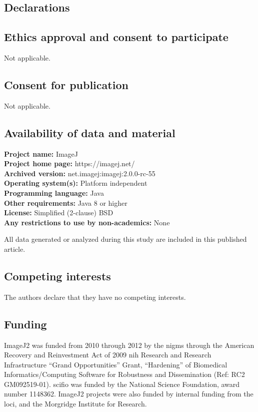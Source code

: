 \documentclass{bmcart}
\begin{document}
\begin{backmatter}

\section*{Declarations}

\subsection*{Ethics approval and consent to participate}
Not applicable.

\subsection*{Consent for publication}
Not applicable.

\subsection*{Availability of data and material}

\textbf{Project name:} ImageJ\\
\textbf{Project home page:} https://imagej.net/\\
\textbf{Archived version:} net.imagej:imagej:2.0.0-rc-55\\
\textbf{Operating system(s):} Platform independent\\
\textbf{Programming language:} Java\\
\textbf{Other requirements:} Java 8 or higher\\
\textbf{License:} Simplified (2-clause) BSD\\
\textbf{Any restrictions to use by non-academics:} None

All data generated or analyzed during this study are included in this
published article.

\subsection*{Competing interests}
  The authors declare that they have no competing interests.

\subsection*{Funding}
  ImageJ2 was funded from 2010 through 2012 by the \acrfull{nigms} through the
  American Recovery and Reinvestment Act of 2009 \acrshort{nih} Research and
  Research Infrastructure ``Grand Opportunities'' Grant, ``Hardening'' of
  Biomedical Informatics/Computing Software for Robustness and Dissemination
  (Ref: RC2 GM092519-01). \acrshort{scifio} was funded by the National Science
  Foundation, award number 1148362. ImageJ2 projects were also funded by
  internal funding from the \acrlong{loci}, and the Morgridge Institute for
  Research.


\end{backmatter}
\end{document}
